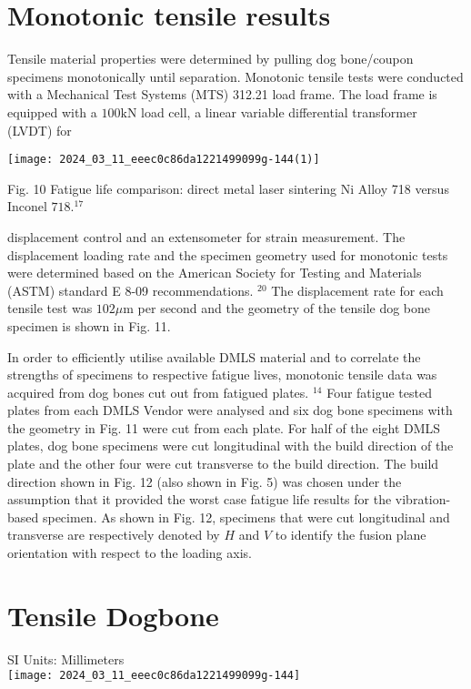 \documentclass[10pt]{article}
\begin{document}
\section*{Monotonic tensile results}
Tensile material properties were determined by pulling dog bone/coupon specimens monotonically until separation. Monotonic tensile tests were conducted with a Mechanical Test Systems (MTS) 312.21 load frame. The load frame is equipped with a $100 \mathrm{kN}$ load cell, a linear variable differential transformer (LVDT) for

\begin{center}
\texttt{[image: 2024\_03\_11\_eeec0c86da1221499099g-144(1)]}
\end{center}

Fig. 10 Fatigue life comparison: direct metal laser sintering Ni Alloy 718 versus Inconel $718 .{ }^{17}$

displacement control and an extensometer for strain measurement. The displacement loading rate and the specimen geometry used for monotonic tests were determined based on the American Society for Testing and Materials (ASTM) standard E 8-09 recommendations. ${ }^{20}$ The displacement rate for each tensile test was $102 \mu \mathrm{m}$ per second and the geometry of the tensile dog bone specimen is shown in Fig. 11.

In order to efficiently utilise available DMLS material and to correlate the strengths of specimens to respective fatigue lives, monotonic tensile data was acquired from dog bones cut out from fatigued plates. ${ }^{14}$ Four fatigue tested plates from each DMLS Vendor were analysed and six dog bone specimens with the geometry in Fig. 11 were cut from each plate. For half of the eight DMLS plates, dog bone specimens were cut longitudinal with the build direction of the plate and the other four were cut transverse to the build direction. The build direction shown in Fig. 12 (also shown in Fig. 5) was chosen under the assumption that it provided the worst case fatigue life results for the vibration-based specimen. As shown in Fig. 12, specimens that were cut longitudinal and transverse are respectively denoted by $H$ and $V$ to identify the fusion plane orientation with respect to the loading axis.

\section*{Tensile Dogbone}
SI Units: Millimeters\\
\texttt{[image: 2024\_03\_11\_eeec0c86da1221499099g-144]}
\end{document}
